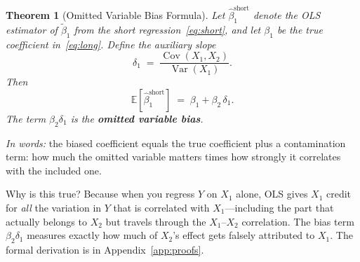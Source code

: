 \documentclass[11pt,a4paper]{article}
\theoremstyle{definition}
\theoremstyle{plain}
\newtheorem{theorem}{Theorem}[section]
\theoremstyle{remark}
\newcommand{\E}{\mathbb{E}}
\newcommand{\Var}{\operatorname{Var}}
\newcommand{\Cov}{\operatorname{Cov}}
\newcommand{\bhat}{\hat{\beta}}
\begin{document}
\begin{theorem}[Omitted Variable Bias Formula]\label{thm:ovb}
Let $\bhat_1^{\text{short}}$ denote the OLS estimator of $\tilde\beta_1$ from the short regression~\eqref{eq:short}, and let $\beta_1$ be the true coefficient in~\eqref{eq:long}.  Define the \emph{auxiliary slope}
\[
  \delta_1 \;=\; \frac{\Cov(X_1, X_2)}{\Var(X_1)}.
\]
Then
\begin{equation}\label{eq:ovb}
  \E[\bhat_1^{\text{short}}] \;=\; \beta_1 + \beta_2 \, \delta_1.
\end{equation}
The term $\beta_2 \delta_1$ is the \textbf{omitted variable bias}.
\end{theorem}

\emph{In words:} the biased coefficient equals the true coefficient plus a contamination term: how much the omitted variable matters times how strongly it correlates with the included one.

Why is this true? Because when you regress $Y$ on $X_1$ alone, OLS gives $X_1$ credit for \emph{all} the variation in $Y$ that is correlated with $X_1$---including the part that actually belongs to $X_2$ but travels through the $X_1$--$X_2$ correlation. The bias term $\beta_2 \delta_1$ measures exactly how much of $X_2$'s effect gets falsely attributed to $X_1$. The formal derivation is in Appendix~\ref{app:proofs}.
\end{document}
